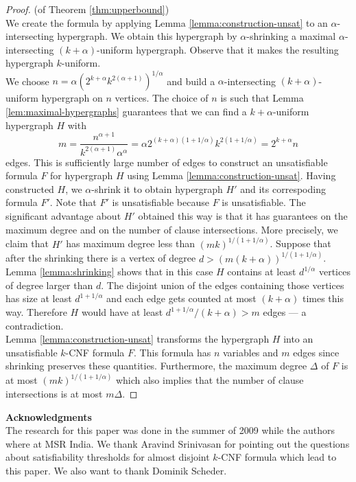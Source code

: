 \documentclass[11pt,letterpaper]{article}
\begin{document}
\begin{proof} (of Theorem \ref{thm:upperbound})\\
We create the formula by applying Lemma \ref{lemma:construction-unsat} to an $\alpha$-intersecting hypergraph. We obtain this hypergraph by  $\alpha$-shrinking a maximal $\alpha$-intersecting $(k+\alpha)$-uniform hypergraph. Observe that it makes the resulting hypergraph $k$-uniform.\\

We choose $n = \alpha \left(2^{k+\alpha}k^{2(\alpha+1)}\right)^{1/\alpha}$ and build a $\alpha$-intersecting $(k+\alpha)$-uniform hypergraph on $n$ vertices. The choice of $n$ is such that Lemma \ref{lem:maximal-hypergraphs} guarantees that we can find a $k+\alpha$-uniform hypergraph $H$ with $$m = \frac{n^{\alpha+1}}{k^{2(\alpha+1)}\alpha^\alpha} = \alpha 2^{(k+\alpha)(1+1/\alpha)}{k^{2(1+1/\alpha)}} = 2^{k+\alpha}n$$ edges. This is sufficiently large number of edges to construct an unsatisfiable formula $F$ for hypergraph $H$ using Lemma \ref{lemma:construction-unsat}. Having constructed $H$, we $\alpha$-shrink it to obtain hypergraph $H'$ and its correspoding formula $F'$.  Note that $F'$ is unsatisfiable because $F$ is unsatisfiable.  The significant advantage about $H'$ obtained this way is that it has guarantees on the maximum degree and on the number of clause intersections. More precisely, we claim that $H'$ has maximum degree less than $(mk)^{1/(1+1/\alpha)}$. Suppose that after the shrinking there is a vertex of degree $d > (m(k+ \alpha))^{1/(1+1/\alpha)}$. Lemma \ref{lemma:shrinking} shows that in this case $H$ contains at least $d^{1/\alpha}$ vertices of degree larger than $d$. The disjoint union of the edges containing those vertices has size at least $d^{1+1/\alpha}$ and each edge gets counted at most $(k+\alpha)$ times this way. Therefore $H$ would have at least $d^{1+1/\alpha}/(k+\alpha) > m$ edges --- a contradiction.\\

Lemma \ref{lemma:construction-unsat} transforms the hypergraph $H$ into an unsatisfiable $k$-CNF formula $F$. This formula has $n$ variables and $m$ edges since shrinking preserves these quantities. Furthermore, the maximum degree $\Delta$ of $F$ is at most $(mk)^{1/(1+1/\alpha)}$ which also implies that the number of clause intersections is at most $m\Delta$.
\end{proof}

\medskip

{\bfseries Acknowledgments}\\
The research for this paper was done in the summer of 2009 while the authors where at MSR India. We thank Aravind Srinivasan for pointing out the questions about satisfiability thresholds for almost disjoint $k$-CNF formula which lead to this paper. We also want to thank Dominik Scheder. 


    
\end{document}
